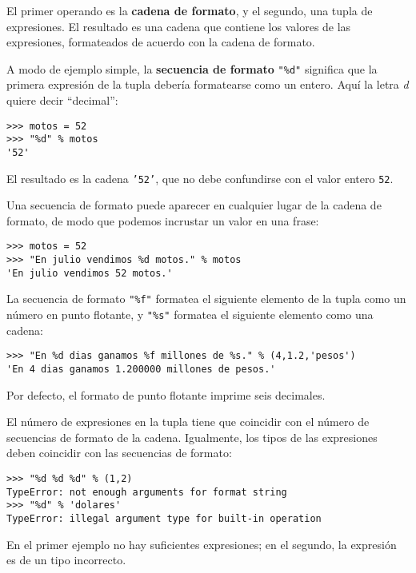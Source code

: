El primer operando es la \textbf{cadena de formato}, y el segundo,
una tupla de expresiones. El resultado es una cadena que contiene
los valores de las expresiones, formateados de acuerdo con la cadena
de formato.

A modo de ejemplo simple, la \textbf{secuencia de formato} {\verb+"%d"+}
significa que la primera expresión de la tupla debería formatearse
como un entero. Aquí la letra {\em d} quiere decir ``decimal'':
\begin{lstlisting}
>>> motos = 52
>>> "%d" % motos
'52'
\end{lstlisting}
El resultado es la cadena \texttt{'52'}, que no debe confundirse con
el valor entero \texttt{52}.

Una secuencia de formato puede aparecer en cualquier lugar de la cadena
de formato, de modo que podemos incrustar un valor en una frase:
\begin{lstlisting}
>>> motos = 52
>>> "En julio vendimos %d motos." % motos
'En julio vendimos 52 motos.'
\end{lstlisting}
La secuencia de formato {\verb+"%f"+} formatea el siguiente elemento
de la tupla como un número en punto flotante, y {\verb+"%s"+} formatea
el siguiente elemento como una cadena:
\begin{lstlisting}
>>> "En %d dias ganamos %f millones de %s." % (4,1.2,'pesos')
'En 4 dias ganamos 1.200000 millones de pesos.'
\end{lstlisting}
Por defecto, el formato de punto flotante imprime seis decimales.

El número de expresiones en la tupla tiene que coincidir con el número
de secuencias de formato de la cadena. Igualmente, los tipos de las
expresiones deben coincidir con las secuencias de formato:

\begin{lstlisting}
>>> "%d %d %d" % (1,2)
TypeError: not enough arguments for format string
>>> "%d" % 'dolares'
TypeError: illegal argument type for built-in operation
\end{lstlisting}
En el primer ejemplo no hay suficientes expresiones; en el segundo,
la expresión es de un tipo incorrecto.

